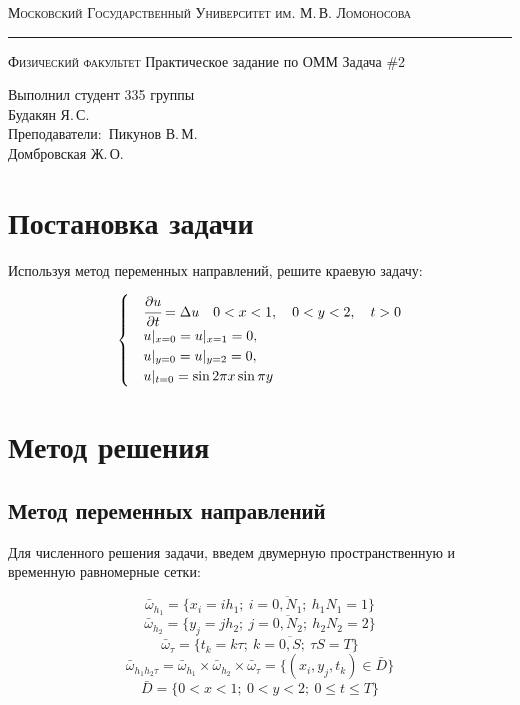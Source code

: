 \documentclass[12pt]{article}
\author{Будакян Я. С.}
\def\dd#1#2{\cfrac{\partial#1}{\partial#2}}
\begin{document}
	\begin{titlepage}
		\begin{center}
			{\small\textsc{Московский Государственный Университет им. М.\,В. Ломоносова}}
			\vskip 1pt \hrule \vskip 3pt
			{\small\textsc{Физический факультет}}
			\vfill
			{\Large Практическое задание по ОММ}
			\break
			\break
			{\Large Задача \#2}	
		\end{center}
		
		\vfill
		
		\begin{flushright}
			{Выполнил студент 335 группы\\Будакян Я.\,С.\\
			 Преподаватели:\ Пикунов В.\,М. \\ Домбровская Ж.\,О.}
		\end{flushright}
	\end{titlepage}
	
	\section{Постановка задачи}
		\bigskip\par{}
		Используя метод переменных направлений, решите краевую задачу:
		
		\begin{equation}
			\begin{cases}
				&\dd{u}t = \Delta u \quad 0 < x < 1, \quad 0 < y < 2, \quad t > 0 \\
				&u\vert_{x=0} = u\vert_{x=1} = 0,\\
				&u\vert_{y=0} = u\vert_{y=2} = 0,\\
				&u\vert_{t=0} = \sin 2\pi x \sin \pi y
			\end{cases}
		\end{equation}
	
	\section{Метод решения}
		\subsection{Метод переменных направлений}
			Для численного решения задачи, введем двумерную пространственную и временную равномерные сетки:
			
			$$\bar{\omega}_{h_1} = \{x_i = ih_1;\ i = \overline{0,N_1};\ h_1 N_1 = 1\}$$
			$$\bar{\omega}_{h_2} = \{y_j = jh_2;\ j = \overline{0,N_2};\ h_2 N_2 = 2\}$$
			$$\bar{\omega}_\tau = \{t_k = k\tau;\ k =\overline{0,S};\ \tau S = T\}$$
			$$\bar{\omega}_{h_1 h_2 \tau} = \bar{\omega}_{h_1} \times \bar{\omega}_{h_2} \times \bar{\omega}_\tau = 
			\{ (x_i, y_j, t_k) \in \bar{D} \}$$
			$$\bar{D} = \{ 0 < x < 1;\ 0 < y < 2;\ 0 \le t \le T \}$$
			
\end{document}
